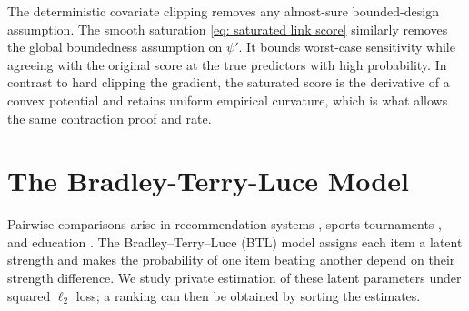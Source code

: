 \documentclass[letterpaper,12pt]{article}
\numberwithin{equation}{section}
\theoremstyle{plain}
\numberwithin{Theorem}{section}
\numberwithin{proposition}{section}
\numberwithin{Lemma}{section}
{
	\theoremstyle{definition}
	\newtheorem{Definition}{Definition}
	\newtheorem{example}{Example}
	\numberwithin{example}{section}
	\newtheorem{fact}{Fact}
	\numberwithin{fact}{section}
	\newtheorem{remark}{Remark}
}
\newcommand{\1}{\mathbbm{1}}
\begin{document}
{The deterministic covariate clipping removes any almost-sure bounded-design assumption.  The smooth saturation \eqref{eq: saturated link score} similarly removes the global boundedness assumption on $\psi'$.  It bounds worst-case sensitivity while agreeing with the original score at the true predictors with high probability.  In contrast to hard clipping the gradient, the saturated score is the derivative of a convex potential and retains uniform empirical curvature, which is what allows the same contraction proof and rate.}


\section{The Bradley-Terry-Luce Model}\label{sec: BTL}

Pairwise comparisons arise in recommendation systems \cite{balakrishnan2012two}, sports tournaments \cite{masarotto2012ranking}, and education \cite{heldsinger2010using}. The Bradley--Terry--Luce (BTL) model assigns each item a latent strength and makes the probability of one item beating another depend on their strength difference. We study private estimation of these latent parameters under squared $\ell_2$ loss; a ranking can then be obtained by sorting the estimates.
\end{document}
